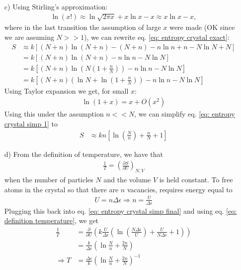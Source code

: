 \documentclass[11pt]{article}
\newcounter{excount}
\newenvironment{exercise}[1][]{\addtocounter{excount}{1} \noindent {\bf Exercise
    \arabic{excount} #1}\hspace{2mm}}{\vspace{4mm}}
\begin{document}
\begin{exercise}
\begin{itemize}
		\item[c)]
			Using Stirling's approximation:
			\begin{align}
				\ln (x!) \approx \ln \sqrt{2\pi x} + x\ln x - x \approx x\ln x - x,
			\end{align}
			where in the last transition the assumption of large $x$ were made (OK since we are assuming $N>>1$), we can rewrite eq. \eqref{eq: entropy crystal exact}:
			\begin{align}
				S	&\approx k\left[(N+n)\ln (N+n) - (N+n) - n\ln n + n - N\ln N + N \right] \nonumber \\
					&= k\left[(N+n)\ln(N+n) - n\ln n - N \ln N \right] \nonumber \\
					&= k\left[(N+n) \ln \left( N \left( 1+\frac{n}{N} \right) \right) -n \ln n - N \ln N \right] \nonumber \\
					&= k \left[ (N+n) \left( \ln N + \ln \left( 1+\frac{n}{N} \right) \right) - n\ln n - N\ln N \right] \label{eq: entropy crystal simp 1}
			\end{align}
			Using Taylor expansion we get, for small $x$:
			\begin{align*}
				\ln (1+x) = x + O(x^2)
			\end{align*}
			Using this under the assumption $n << N$, we can simplify eq. \eqref{eq: entropy crystal simp 1} to
			\begin{align}
				S 	&\approx kn\left[\ln \left( \frac{N}{n} \right) +\frac{n}{N} + 1  \right] \label{eq: entropy crystal simp final}
			\end{align}
		
		
		
		
		
		\item[d)]
			From the definition of temperature, we have that
			\begin{align}
				\frac{1}{T} = \left( \frac{\partial S}{\partial U} \right) _{N,V} \label{eq: definition temperature}
			\end{align}
			when the number of particles $N$ and the volume $V$ is held constant. To free atoms in the crystal so that there are $n$ vacancies, requires energy equal to
			\begin{align*}
				U = n\Delta \epsilon \Rightarrow n = \frac{U}{\Delta \epsilon}
			\end{align*}
			Plugging this back into eq. \eqref{eq: entropy crystal simp final} and using eq. \eqref{eq: definition temperature}, we get
			\begin{align*}
				\frac{1}{T} 	&= \frac{\partial}{\partial U} \left( k \frac{U}{\Delta \epsilon} \left( \ln \left( \frac{N \Delta \epsilon}{U} \right) + \frac{U}{N\Delta \epsilon} + 1 \right)  \right) \\
									&= \frac{k}{\Delta \epsilon} \left( \ln  \frac{N}{n}  + \frac{2n}{N} \right) \\
			\Rightarrow T	&= \frac{\Delta \epsilon}{k} \left( \ln  \frac{N}{n}  +\frac{2n}{N} \right) ^{-1}
			\end{align*}
			

\end{itemize}
\end{exercise}
\end{document}
